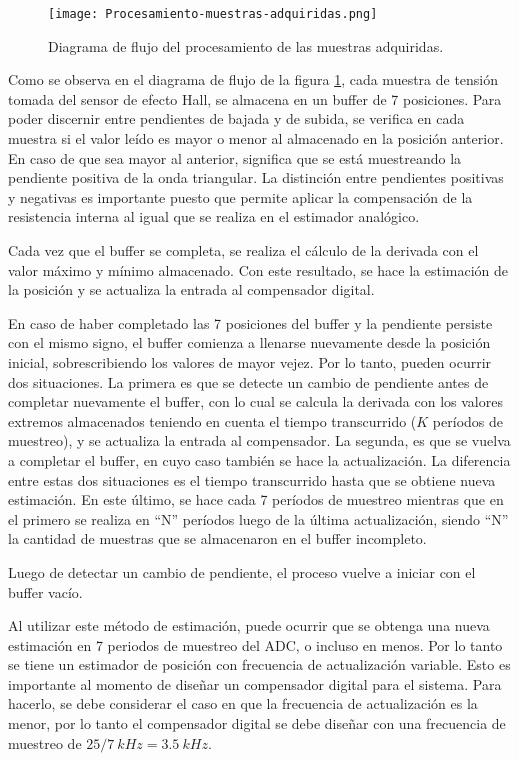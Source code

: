 \begin{figure}[H]
	\centering
	\texttt{[image: Procesamiento-muestras-adquiridas.png]}
	\caption{ Diagrama de flujo del procesamiento de las muestras adquiridas.}
	\label{fig:procesamiento-muestras-adquiridas}
\end{figure}


\noindent Como se observa en el diagrama de flujo de la figura \ref{fig:procesamiento-muestras-adquiridas}, cada muestra de tensión tomada del sensor de efecto Hall, se almacena en un buffer de 7 posiciones. Para poder discernir entre pendientes de bajada y de subida, se verifica en cada muestra si el valor leído es mayor o menor al almacenado en la posición anterior. En caso de que sea mayor al anterior, significa que se está muestreando la pendiente positiva de la onda triangular. La distinción entre pendientes positivas y negativas es importante puesto que permite aplicar la compensación de la resistencia interna al igual que se realiza en el estimador analógico. 

\noindent Cada vez que el buffer se completa, se realiza el cálculo de la derivada con el valor máximo y mínimo almacenado. Con este resultado, se hace la estimación de la posición y se actualiza la entrada al compensador digital.

\noindent En caso de haber completado las 7 posiciones del buffer y la pendiente persiste con el mismo signo, el buffer comienza a llenarse nuevamente desde la posición inicial, sobrescribiendo los valores de mayor vejez. Por lo tanto, pueden ocurrir dos situaciones. La primera es que se detecte un cambio de pendiente antes de completar nuevamente el buffer, con lo cual se calcula la derivada con los valores extremos almacenados teniendo en cuenta el tiempo transcurrido ($K$ períodos de muestreo), y se actualiza la entrada al compensador. La segunda, es que se vuelva a completar el buffer, en cuyo caso también se hace la actualización. La diferencia entre estas dos situaciones es el tiempo transcurrido hasta que se obtiene nueva estimación. En este último, se hace cada 7 períodos de muestreo mientras que en el primero se realiza en “N” períodos luego de la última actualización, siendo “N” la cantidad de muestras que se almacenaron en el buffer incompleto.

\noindent Luego de detectar un cambio de pendiente, el
proceso vuelve a iniciar con el buffer vacío.

\noindent Al utilizar este método de estimación, puede ocurrir que se obtenga una nueva estimación en 7 periodos de muestreo del ADC, o incluso en menos. Por lo tanto se tiene un estimador de posición con frecuencia de actualización variable. Esto es importante al momento de diseñar un compensador digital para el sistema. Para hacerlo, se debe considerar el caso en que la frecuencia de actualización es la menor, por lo tanto el compensador digital se debe diseñar con una frecuencia de muestreo de $25/7 \:kHz = 3.5\:kHz$.

